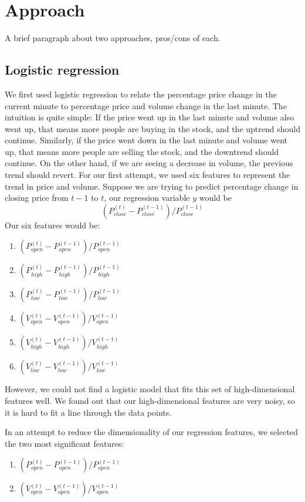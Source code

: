 \documentclass[10pt,twocolumn,letterpaper]{article}
\begin{document}
\section{Approach}
A brief paragraph about two approaches, pros/cons of each.

\subsection{Logistic regression}
We first used logistic regression to relate the percentage price change in the current minute to percentage price and volume
change in the last minute. The intuition is quite simple: If the price went up in the last minute and volume also went up,
that means more people are buying in the stock, and the uptrend should continue. Similarly, if the price went down in the 
last minute and volume went up, that means more people are selling the stock, and the downtrend should continue. On
the other hand, if we are seeing a decrease in volume, the previous trend should revert. For our first attempt, we used
six features to represent the trend in price and volume. Suppose we are trying to predict percentage change in closing price
from $t - 1$ to $t$, our regression variable $y$ would be
\begin{equation}
\left(P_{close}^{(t)} - P_{close}^{(t-1)}\right)/P_{close}^{(t-1)}
\end{equation}
Our six features would be:
\begin{enumerate}
\item $\left(P_{open}^{(t)} - P_{open}^{(t-1)}\right)/P_{open}^{(t-1)}$
\item $\left(P_{high}^{(t)} - P_{high}^{(t-1)}\right)/P_{high}^{(t-1)}$
\item $\left(P_{low}^{(t)} - P_{low}^{(t-1)}\right)/P_{low}^{(t-1)}$
\item $\left(V_{open}^{(t)} - V_{open}^{(t-1)}\right)/V_{open}^{(t-1)}$
\item $\left(V_{high}^{(t)} - V_{high}^{(t-1)}\right)/V_{high}^{(t-1)}$
\item $\left(V_{low}^{(t)} - V_{low}^{(t-1)}\right)/V_{low}^{(t-1)}$
\end{enumerate} 
However, we could not find a logistic model that fits this set of high-dimensional features well. We found out that our
high-dimensional features are very noisy, so it is hard to fit a line through the data points. 

In an attempt to reduce the dimensionality of our regression features, we selected the two most significant features: 
\begin{enumerate}
\item $\left(P_{open}^{(t)} - P_{open}^{(t-1)}\right)/P_{open}^{(t-1)}$
\item $\left(V_{open}^{(t)} - V_{open}^{(t-1)}\right)/V_{open}^{(t-1)}$
\end{enumerate}
\end{document}
